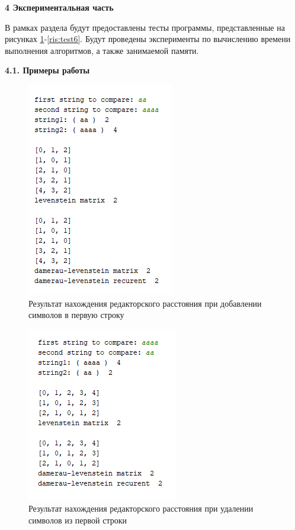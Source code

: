 \documentclass[a4paper,12pt]{report}
\begin{document}
    \begin{center}
        \textbf{4 Экспериментальная часть}
        \label{sec:experimental_part}
		\begin{flushleft}
			В рамках раздела будут предоставлены тесты программы, представленные на рисунках \ref{ris:test1}-\ref{ris:test6}. Будут проведены эксперименты по вычислению времени выполнения алгоритмов, а также занимаемой памяти.
		\end{flushleft}

        \textbf{4.1. Примеры работы}
        \begin{figure}[h!]
        	\includegraphics[width=0.6\linewidth]{test6.jpg}
        	\caption{Результат нахождения редакторского расстояния при добавлении символов в первую строку}
        	\label{ris:test1}
        \end{figure}
    
    	\newpage
    	\begin{figure}[h!]
    		\includegraphics[width=0.6\linewidth]{test5.jpg}
    		\caption{Результат нахождения редакторского расстояния при удалении символов из первой строки}
    		\label{ris:test2}
    	\end{figure}
    

\end{center}
\end{document}
